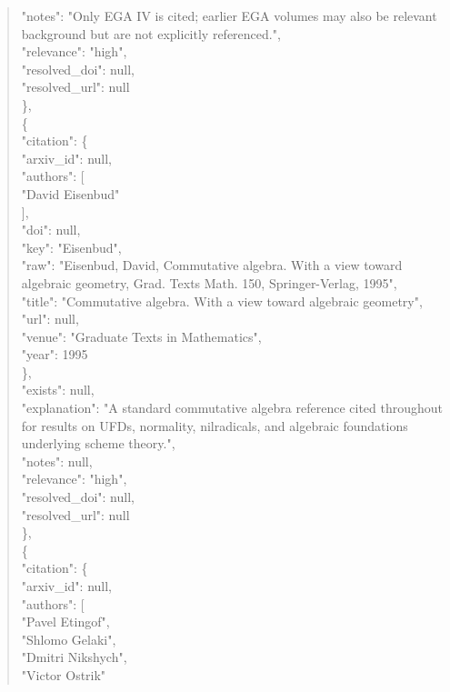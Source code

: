 \documentclass[11pt]{article}
\begin{document}
\begin{quote}
      "notes": "Only EGA IV is cited; earlier EGA volumes may also be relevant background but are not explicitly referenced.",\\
      "relevance": "high",\\
      "resolved\_doi": null,\\
      "resolved\_url": null\\
    \},\\
    \{\\
      "citation": \{\\
        "arxiv\_id": null,\\
        "authors": [\\
          "David Eisenbud"\\
        ],\\
        "doi": null,\\
        "key": "Eisenbud",\\
        "raw": "Eisenbud, David, Commutative algebra. With a view toward algebraic geometry, Grad. Texts Math. 150, Springer-Verlag, 1995",\\
        "title": "Commutative algebra. With a view toward algebraic geometry",\\
        "url": null,\\
        "venue": "Graduate Texts in Mathematics",\\
        "year": 1995\\
      \},\\
      "exists": null,\\
      "explanation": "A standard commutative algebra reference cited throughout for results on UFDs, normality, nilradicals, and algebraic foundations underlying scheme theory.",\\
      "notes": null,\\
      "relevance": "high",\\
      "resolved\_doi": null,\\
      "resolved\_url": null\\
    \},\\
    \{\\
      "citation": \{\\
        "arxiv\_id": null,\\
        "authors": [\\
          "Pavel Etingof",\\
          "Shlomo Gelaki",\\
          "Dmitri Nikshych",\\
          "Victor Ostrik"\\

\end{quote}
\end{document}
